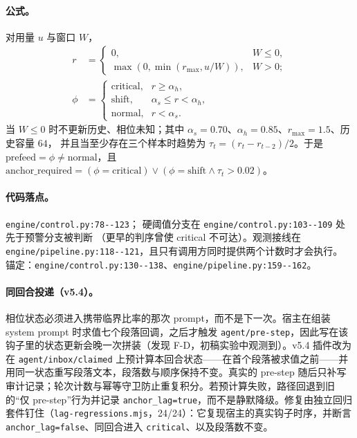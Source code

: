 \paragraph{公式。} 对用量 $u$ 与窗口 $W$，
{\small
\begin{equation}
\begin{aligned}
r &= \begin{cases}
0, & W \le 0,\\
\max(0, \min(r_{\max}, u/W)), & W > 0;
\end{cases}\\
\phi &= \begin{cases}
\text{critical}, & r \ge \alpha_h,\\
\text{shift}, & \alpha_s \le r < \alpha_h,\\
\text{normal}, & r < \alpha_s.
\end{cases}
\end{aligned}
\end{equation}
}
当 $W \le 0$ 时不更新历史、相位未知；其中 $\alpha_s=0.70$、$\alpha_h=0.85$、$r_{\max}=1.5$、历史容量 $64$，
并且当至少存在三个样本时趋势为 $\tau_t = (r_t - r_{t-2})/2$。于是
$\mathrm{prefeed} = \phi \ne \text{normal}$，且
$\mathrm{anchor\_required} = (\phi = \text{critical}) \lor
(\phi = \text{shift} \land \tau_t > 0.02)$。

\paragraph{代码落点。} \texttt{engine/\allowbreak{}control.\allowbreak{}py:\allowbreak{}78-\allowbreak{}-\allowbreak{}123}；
硬阈值分支在 \texttt{engine/\allowbreak{}control.\allowbreak{}py:\allowbreak{}103-\allowbreak{}-\allowbreak{}109} 处先于预警分支被判断
（更早的判序曾使 critical 不可达）。观测接线在
\texttt{engine/\allowbreak{}pipeline.\allowbreak{}py:\allowbreak{}118-\allowbreak{}-\allowbreak{}121}，且只有调用方同时提供两个计数时才会执行。
锚定：\texttt{engine/\allowbreak{}control.\allowbreak{}py:\allowbreak{}130-\allowbreak{}-\allowbreak{}138}、\texttt{engine/\allowbreak{}pipeline.\allowbreak{}py:\allowbreak{}159-\allowbreak{}-\allowbreak{}162}。

\paragraph{同回合投递（v5.4）。} 相位状态必须进入携带临界比率的那次 prompt，而不是下一次。宿主在组装 system prompt 时求值七个段落回调，之后才触发 \texttt{agent/pre-step}，因此写在该钩子里的状态更新会晚一次拼装（发现 F-D，初稿实验中观测到）。v5.4 插件改为在 \texttt{agent/inbox/claimed} 上预计算本回合状态——在首个段落被求值之前——并用同一状态重写段落文本，段落数与顺序保持不变。真实的 pre-step 随后只补写审计记录；轮次计数与幂等守卫防止重复积分。若预计算失败，路径回退到旧的“仅 pre-step”行为并记录 \texttt{anchor\_lag=true}，而不是静默降级。修复由独立回归套件钉住（\texttt{lag-regressions.mjs}，24/24）：它复现宿主的真实钩子时序，并断言 \texttt{anchor\_lag=false}、同回合进入 \texttt{critical}、以及段落数不变。

